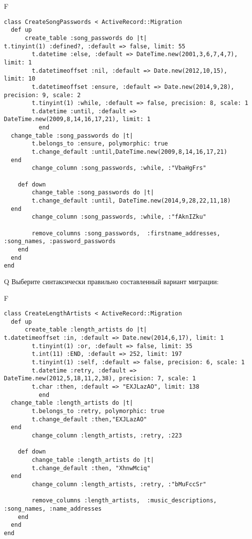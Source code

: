 F
\begin{verbatim}
class CreateSongPasswords < ActiveRecord::Migration
  def up
	  create_table :song_passwords do |t|
t.tinyint(1) :defined?, :default => false, limit: 55
		t.datetime :else, :default => DateTime.new(2001,3,6,7,4,7), limit: 1
		t.datetimeoffset :nil, :default => Date.new(2012,10,15), limit: 10
		t.datetimeoffset :ensure, :default => Date.new(2014,9,28), precision: 9, scale: 2
		t.tinyint(1) :while, :default => false, precision: 8, scale: 1
		t.datetime :until, :default => DateTime.new(2009,8,14,16,17,21), limit: 1
		  end
  change_table :song_passwords do |t|
		t.belongs_to :ensure, polymorphic: true
 		t.change_default :until,DateTime.new(2009,8,14,16,17,21)
  end
 		change_column :song_passwords, :while, :"VbaHgFrs"
   
	def down
		change_table :song_passwords do |t|
		t.change_default :until, DateTime.new(2014,9,28,22,11,18)
  end
 		change_column :song_passwords, :while, :"fAknIZku"
   
		remove_columns :song_passwords,  :firstname_addresses, :song_names, :password_passwords 
    end 
  end
end

\end{verbatim}

Q
Выберите синтаксически правильно составленный вариант миграции:

F
\begin{verbatim}
class CreateLengthArtists < ActiveRecord::Migration
  def up
	  create_table :length_artists do |t|
t.datetimeoffset :in, :default => Date.new(2014,6,17), limit: 1
		t.tinyint(1) :or, :default => false, limit: 35
		t.int(11) :END, :default => 252, limit: 197
		t.tinyint(1) :self, :default => false, precision: 6, scale: 1
		t.datetime :retry, :default => DateTime.new(2012,5,18,11,2,38), precision: 7, scale: 1
		t.char :then, :default => "EXJLazAO", limit: 138
		  end
  change_table :length_artists do |t|
		t.belongs_to :retry, polymorphic: true
 		t.change_default :then,"EXJLazAO"
  end
 		change_column :length_artists, :retry, :223
   
	def down
		change_table :length_artists do |t|
		t.change_default :then, "XhnwMciq"
  end
 		change_column :length_artists, :retry, :"bMuFccSr"
   
		remove_columns :length_artists,  :music_descriptions, :song_names, :name_addresses 
    end 
  end
end

\end{verbatim}

